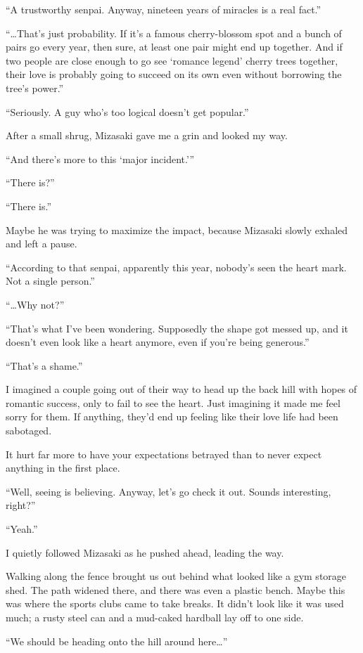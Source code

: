 \documentclass[
    a4paper,
    12pt,
    twoside,
    openany,
    UTF8,
    fontset=windows
]{ctexbook}
\begin{document}
``A trustworthy senpai. Anyway, nineteen years of miracles is a real fact.''

``\dots That's just probability. If it's a famous cherry-blossom spot and a bunch of pairs go every year, then sure, at least one pair might end up together. And if two people are close enough to go see `romance legend' cherry trees together, their love is probably going to succeed on its own even without borrowing the tree's power.''

``Seriously. A guy who's too logical doesn't get popular.''

After a small shrug, Mizasaki gave me a grin and looked my way.

``And there's more to this `major incident.'''

``There is?''

``There is.''

Maybe he was trying to maximize the impact, because Mizasaki slowly exhaled and left a pause.

``According to that senpai, apparently this year, nobody's seen the heart mark. Not a single person.''

``\dots Why not?''

``That's what I've been wondering. Supposedly the shape got messed up, and it doesn't even look like a heart anymore, even if you're being generous.''

``That's a shame.''

I imagined a couple going out of their way to head up the back hill with hopes of romantic success, only to fail to see the heart. Just imagining it made me feel sorry for them. If anything, they'd end up feeling like their love life had been sabotaged.

It hurt far more to have your expectations betrayed than to never expect anything in the first place.

``Well, seeing is believing. Anyway, let's go check it out. Sounds interesting, right?''

``Yeah.''

I quietly followed Mizasaki as he pushed ahead, leading the way.

Walking along the fence brought us out behind what looked like a gym storage shed. The path widened there, and there was even a plastic bench. Maybe this was where the sports clubs came to take breaks. It didn't look like it was used much; a rusty steel can and a mud-caked hardball lay off to one side.

``We should be heading onto the hill around here\dots''
\end{document}

